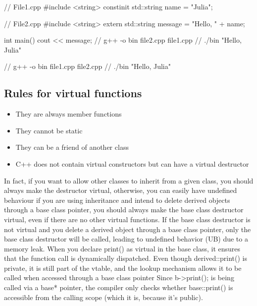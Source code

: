 \documentclass{report}
\begin{document}
\bigbreak \noindent 
\begin{cppcode}
    // File1.cpp
    #include <string>
    constinit std::string name = "Julia";

    // File2.cpp
    #include <string>
    extern std::string message = "Hello, " + name;

    int main() {cout << message;}
    // g++ -o bin file2.cpp file1.cpp
    // ./bin "Hello, Julia"

    // g++ -o bin file1.cpp file2.cpp
    // ./bin "Hello, Julia"
\end{cppcode}

\pagebreak 
{}
\bigbreak \noindent 
\subsection{Rules for virtual functions}
\bigbreak \noindent 
\begin{itemize}
    \item They are always member functions
    \item They cannot be static
    \item They can be a friend of another class
    \item C++ does not contain virtual constructors but can have a virtual destructor
\end{itemize}
\bigbreak \noindent 
In fact, if you want to allow other classes to inherit from a given class, you should always make the destructor virtual, otherwise, you can easily have undefined behaviour
\bigbreak \noindent 
if you are using inheritance and intend to delete derived objects through a base class pointer, you should always make the base class destructor virtual, even if there are no other virtual functions.
\bigbreak \noindent 
If the base class destructor is not virtual and you delete a derived object through a base class pointer, only the base class destructor will be called, leading to undefined behavior (UB) due to a memory leak.
\bigbreak \noindent 
When you declare print() as virtual in the base class, it ensures that the function call is dynamically dispatched.
\bigbreak \noindent 
Even though derived::print() is private, it is still part of the vtable, and the lookup mechanism allows it to be called when accessed through a base class pointer
\bigbreak \noindent 
Since b->print(); is being called via a base* pointer, the compiler only checks whether base::print() is accessible from the calling scope (which it is, because it's public).
\bigbreak \noindent 
\end{document}
